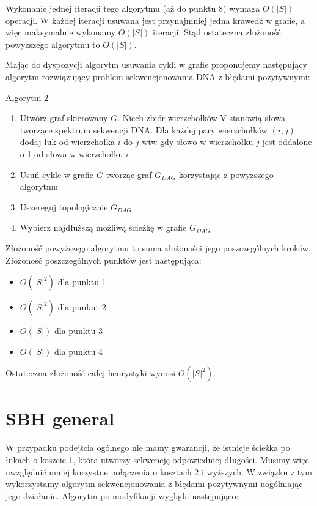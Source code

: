 \documentclass[a4paper,10pt]{article}
\begin{document}
Wykonanie jednej iteracji tego algorytmu (aż do punktu 8) wymaga $O(|S|)$ operacji. W każdej
iteracji usuwana jest przynajmniej jedna krawedź w grafie, a więc maksymalnie wykonamy $O(|S|)$ iteracji. Stąd ostateczna złożoność powyższego
algorytmu to $O(|S|)$.

Mając do dyspozycji algorytm usuwania cykli w grafie proponujemy następujący algorytm rozwiązujący problem sekwencjonowania DNA z błędami pozytywnymi:

Algorytm 2
\begin{enumerate}
 \item Utwórz graf skierowany $G$. Niech zbiór wierzchołków V stanowią słowa tworzące spektrum sekwencji DNA. Dla każdej pary 
 wierzchołków $(i,j)$ dodaj łuk od wierzchołka $i$ do $j$ wtw gdy słowo w wierzchołku $j$ jest oddalone o 1 od słowa w wierzchołku $i$
 \item Usuń cykle w grafie $G$ tworząc graf $G_{DAG}$ korzystając z powyższego algorytmu
 \item Uszereguj topologicznie $G_{DAG}$
 \item Wybierz najdłuższą możliwą ścieżkę w grafie $G_{DAG}$
\end{enumerate}

Złożoność powyższego algorytmu to suma złożoności jego poszczególnych kroków. Złożoność poszczególnych punktów jest następująca:
\begin{itemize}
 \item $O(|S|^2)$ dla punktu 1
 \item $O(|S|^2)$ dla punkut 2
 \item $O(|S|)$ dla punktu 3
 \item $O(|S|)$ dla punktu 4
\end{itemize}

Ostateczna złożoność całej heurystyki wynosi $O(|S|^2)$.

\section{SBH general}
W przypadku podejścia ogólnego nie mamy gwarancji, że istnieje ścieżka po łukach o koszcie 1, która utworzy sekwencję odpowiedniej długości. 
Musimy więc uwzględnić mniej korzystne połączenia o kosztach 2 i wyższych. W związku z tym wykorzystamy algorytm sekwencjonowania z błędami 
pozytywnymi uogólniając jego działanie. Algorytm po modyfikacji wygląda następująco:
\end{document}
